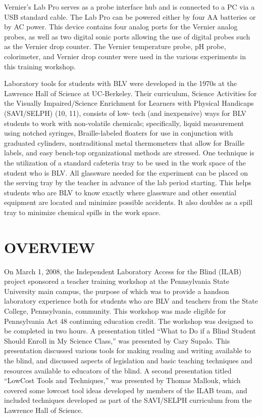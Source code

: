 \documentclass[11.5pt]{sig-alternate} %
\begin{document}
\begin{large}
Vernier’s Lab Pro serves as a probe interface hub and is connected to a PC via a USB standard cable. The Lab Pro can be powered either by four AA batteries or by AC power. This device contains four analog ports for the Vernier analog probes, as well as two digital sonic ports allowing the use of digital probes such as the Vernier drop counter. The Vernier temperature probe, pH probe, colorimeter, and Vernier drop counter were used in the various experiments in this training workshop. 

Laboratory tools for students with BLV were developed in the 1970s at the Lawrence Hall of Science at UC-Berkeley. Their curriculum, Science Activities for the Visually Impaired/Science Enrichment for Learners with Physical Handicaps (SAVI/SELPH) (10, 11), consists of low- tech (and inexpensive) ways for BLV students to work with non-volatile chemicals; specifically, liquid measurement using notched syringes, Braille-labeled floaters for use in conjunction with graduated cylinders, nontraditional metal thermometers that allow for Braille labels, and easy bench-top organizational methods are stressed. One technique is the utilization of a standard cafeteria tray to be used in the work space of the student who is BLV. All glassware needed for the experiment can be placed on the serving tray by the teacher in advance of the lab period starting. This helps students who are BLV to know exactly where glassware and other essential equipment are located and minimize possible accidents. It also doubles as a spill tray to minimize chemical spills in the work space. 

\section*{OVERVIEW}

On March 1, 2008, the Independent Laboratory Access for the Blind (ILAB) project sponsored a teacher training workshop at the Pennsylvania State University main campus, the purpose of which was to provide a handson laboratory experience both for students who are BLV and teachers from the State College, Pennsylvania, community. This workshop was made eligible for Pennsylvania Act 48 continuing education credit. The workshop was designed to be completed in two hours. A presentation titled “What to Do if a Blind Student Should Enroll in My Science Class,” was presented by Cary Supalo. This presentation discussed various tools for making reading and writing available to the blind, and discussed aspects of legislation and basic teaching techniques and resources available to educators of the blind. A second presentation titled “LowCost Tools and Techniques,” was presented by Thomas Mallouk, which covered some lowcost tool ideas developed by members of the ILAB team, and included techniques developed as part of the SAVI/SELPH curriculum from the Lawrence Hall of Science.


\end{large}
\end{document}
